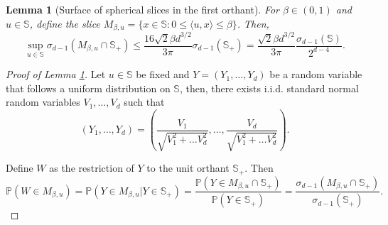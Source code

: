 \documentclass{article}
\makeatletter
\numberwithin{equation}{section}
\newtheorem{lemma}{Lemma}[section]
\renewcommand{\P}{\mathbb{P}}
\newcommand{\as}[1]{}%
\newcommand{\sphere}{\mathbb{S}}
\makeatother
\begin{document}
    \begin{lemma}[Surface of spherical slices in the first orthant]\label{lem:bound_surface_spherical_cap_first_orthant} %
    For \(\beta\in(0,1)\) and
    \(u\in\sphere\), define the slice \(M_{\beta,u}=\{x\in\sphere:0\leq \langle u,x \rangle \leq \beta\}\). 
    Then,
    \begin{equation}\label{eq:bound_surface_spherical_cap_first_orthant}
        \sup_{u\in\sphere}{\sigma_{d-1}(M_{\beta,u}\cap \sphere_{+})} \leq \frac{16\sqrt{2}\beta d^{3/2}}{3\pi}\sigma_{d-1}(\sphere_+) = \frac{\sqrt{2}\beta d^{3/2}}{3\pi}\frac{ \sigma_{d-1}(\sphere)}{2^{d-4}}.
    \end{equation}
    \end{lemma}
%    
\begin{proof}[Proof of Lemma
    \ref{lem:bound_surface_spherical_cap_first_orthant}]
    Let \(u\in\sphere\) be fixed and \(Y=(Y_1,\ldots,Y_d)\) be a
    random variable that follows a uniform
    distribution on \(\sphere\), then, there exists i.i.d. standard normal
    random variables \(V_1,\ldots,V_d\) such that
    \begin{equation}\label{eq:joint_distribution_uniform_sphere}
        \left(Y_1,\ldots,Y_d \right) =
        \left(\frac{V_1}{\sqrt{V_1^2+\dots V_d^2}},\ldots,
        \frac{V_d}{\sqrt{V_1^2+\dots V_d^2}} \right).
    \end{equation}

    Define \(W\) as the restriction of
    \(Y\) to the unit orthant \(\sphere_+\). Then
    \begin{equation}\label{eq:spherical_cap_w}
        \P\left( W\in M_{\beta,u} \right) =  \P\left( Y\in M_{\beta,u} | Y\in
        \sphere_+ \right) = \frac{\P\left(
        Y\in M_{\beta,u}\cap \sphere_+ \right) }{\P \left( Y\in\sphere_+
        \right)} = \frac{
            \sigma_{d-1} \left( M_{\beta,u}\cap\sphere_+ \right)
        }{\sigma_{d-1}(\sphere_+)}.
    \end{equation}


\end{proof}
\end{document}
